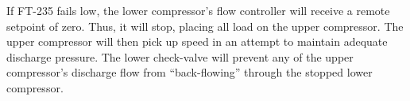 \vskip 10pt

If FT-235 fails low, the lower compressor's flow controller will receive a remote setpoint of zero.  Thus, it will stop, placing all load on the upper compressor.  The upper compressor will then pick up speed in an attempt to maintain adequate discharge pressure.  The lower check-valve will prevent any of the upper compressor's discharge flow from ``back-flowing'' through the stopped lower compressor.




